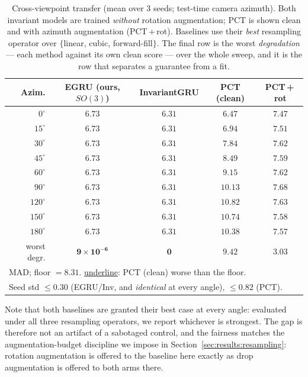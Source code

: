 \documentclass[10pt,journal]{IEEEtran}
\begin{document}
\begin{table}[!t]
\centering
\caption{Cross-viewpoint transfer (mean over 3 seeds; test-time camera azimuth). Both invariant
models are trained \emph{without} rotation augmentation; PCT is shown clean and with azimuth
augmentation (PCT\,+\,rot). Baselines use their \emph{best} resampling operator over $\{$linear,
cubic, forward-fill$\}$. The final row is the worst \emph{degradation} --- each method against its
own clean score --- over the whole sweep, and it is the row that separates a guarantee from a fit.}
\label{tab:viewpoint}
\scriptsize
\setlength{\tabcolsep}{3pt}
\begin{tabular}{rcccc}
\toprule
Azim. & EGRU (ours, $SO(3)$) & InvariantGRU & PCT (clean) & PCT\,+\,rot \\
\midrule
$0^\circ$   & $6.73$ & $6.31$ & $6.47$ & $7.47$ \\
$15^\circ$  & $6.73$ & $6.31$ & $6.94$ & $7.51$ \\
$30^\circ$  & $6.73$ & $6.31$ & $7.84$ & $7.62$ \\
$45^\circ$  & $6.73$ & $6.31$ & \underline{$8.49$} & $7.59$ \\
$60^\circ$  & $6.73$ & $6.31$ & \underline{$9.15$} & $7.62$ \\
$90^\circ$  & $6.73$ & $6.31$ & \underline{$10.13$} & $7.68$ \\
$120^\circ$ & $6.73$ & $6.31$ & \underline{$10.82$} & $7.63$ \\
$150^\circ$ & $6.73$ & $6.31$ & \underline{$10.74$} & $7.58$ \\
$180^\circ$ & $6.73$ & $6.31$ & \underline{$10.38$} & $7.57$ \\
\midrule
worst degr. & $\mathbf{9\!\times\!10^{-6}}$ & $\mathbf{0}$ & $9.42$ & $3.03$ \\
\midrule
\multicolumn{5}{l}{\footnotesize MAD; floor $=8.31$. \underline{underline}: PCT (clean) worse than the
floor.} \\
\multicolumn{5}{l}{\footnotesize Seed std $\le0.30$ (EGRU/Inv, and \emph{identical} at every angle),
$\le0.82$ (PCT).} \\
\bottomrule
\end{tabular}
\end{table}

Note that both baselines are granted their best case at every angle: evaluated under all three
resampling operators, we report whichever is strongest. The gap is therefore not an artifact of a
sabotaged control, and the fairness matches the augmentation-budget discipline we impose in
Section~\ref{sec:results:resampling}: rotation augmentation is offered to the baseline here exactly
as drop augmentation is offered to both arms there.
\end{document}
